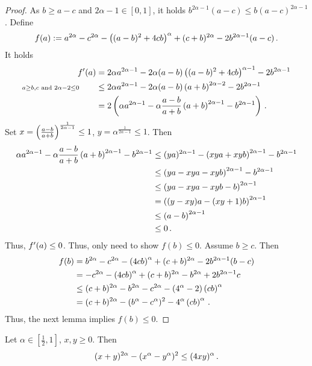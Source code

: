 \begin{proof}
	As $b\geq a-c$ and $2\alpha-1 \in[0,1]$, it holds $b^{2\alpha-1} (a-c) \leq b (a-c)^{2\alpha-1}$.
	Define
	\begin{equation*}
		f(a) := a^{2\alpha}-c^{2\alpha}-\left( (a-b)^2+4cb \right)^{\alpha}+(c+b)^{2\alpha}  -2 b^{2\alpha-1} (a-c)
		\, .
	\end{equation*}
	It holds
	\begin{align*}
		f^\prime(a) &= 	2\alpha a^{2\alpha-1}-2\alpha (a-b)\left( (a-b)^2+4cb \right)^{\alpha-1}-2 b^{2\alpha-1}
		\\ {\scriptstyle a \geq b,c \text{ and } 2\alpha-2\leq 0} \qquad&\leq
		2\alpha a^{2\alpha-1}-2\alpha (a-b)\left( a+b \right)^{2\alpha-2}-2 b^{2\alpha-1}
		\\&=
		2\left( \alpha a^{2\alpha-1}- \alpha \frac{a-b}{a+b}\left( a+b \right)^{2\alpha-1} - b^{2\alpha-1} \right)
		\, .
	\end{align*}
	Set $x = \left( \frac{a-b}{a+b} \right)^{\frac{1}{2\alpha-1}} \leq 1$, $y = \alpha^{\frac{1}{2\alpha-1}} \leq 1$.
	Then 
	\begin{align*}
		\alpha a^{2\alpha-1}- \alpha \frac{a-b}{a+b}\left( a+b \right)^{2\alpha-1} - b^{2\alpha-1}
		&\leq
		(ya)^{2\alpha-1}- \left( xya+xyb \right)^{2\alpha-1} - b^{2\alpha-1}
		\\&\leq
		\left( ya-xya-xyb \right)^{2\alpha-1} - b^{2\alpha-1}
		\\&\leq
		\left( ya-xya-xyb-b \right)^{2\alpha-1}
		\\&=
		\left( (y-xy)a-(xy+1)b \right)^{2\alpha-1}
		\\&\leq
		\left( a-b \right)^{2\alpha-1}
		\\&\leq
		0\, .
	\end{align*}
	Thus, $f^\prime(a) \leq 0$. Thus, only need to show $f(b) \leq 0$.
	Assume $b \geq c$. Then
	\begin{align*}
		f(b) 
		&= 
		b^{2\alpha}-c^{2\alpha}-\left( 4cb \right)^{\alpha}+(c+b)^{2\alpha}  -2 b^{2\alpha-1} (b-c)
		\\&=
		-c^{2\alpha}-\left( 4cb \right)^{\alpha}+(c+b)^{2\alpha}  - b^{2\alpha}+2 b^{2\alpha-1} c
		\\&\leq
		(c+b)^{2\alpha}- b^{2\alpha}-c^{2\alpha}-\left( 4^\alpha-2 \right)\left( cb \right)^{\alpha}
		\\&= 
		(c+b)^{2\alpha}-(b^\alpha-c^\alpha)^2-4^\alpha\left( cb \right)^{\alpha}
		\, .
	\end{align*}
	Thus, the next lemma implies $f(b) \leq 0$.
\end{proof}
%
\begin{lemma}\label{lmm:alpha_binom}
	Let $\alpha\in[\frac12,1]$, $x,y\geq0$.
	Then 
	\begin{equation*}
		(x+y)^{2\alpha}-(x^\alpha-y^\alpha)^2 \leq (4xy)^\alpha
		\, .
	\end{equation*}
\end{lemma}
